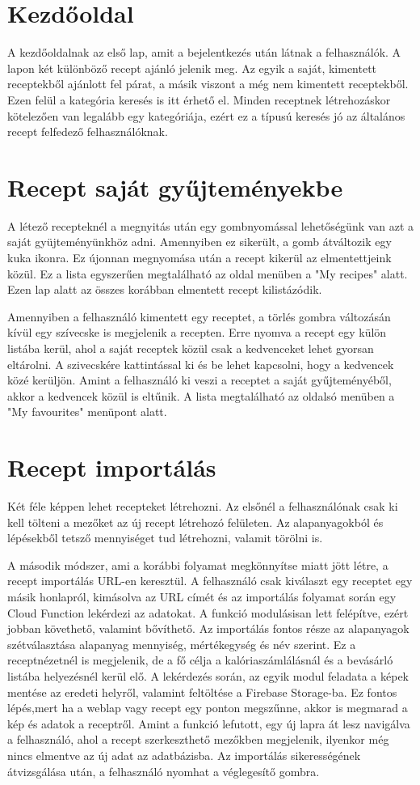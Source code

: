 \documentclass[12pt]{report}
\theoremstyle{definition}
\begin{document}
\section{Kezdőoldal}
A kezdőoldalnak az első lap, amit a bejelentkezés után látnak a felhasználók. A lapon két különböző recept ajánló jelenik meg. Az egyik a saját, kimentett receptekből ajánlott fel párat, a másik viszont a még nem kimentett receptekből. Ezen felül a kategória keresés is itt érhető el. Minden receptnek létrehozáskor kötelezően van legalább egy kategóriája, ezért ez a típusú keresés jó az általános recept felfedező felhasználóknak.

\section{Recept saját gyűjteményekbe}
A létező recepteknél a megnyitás után egy gombnyomással lehetőségünk van azt a saját gyüjteményünkhöz adni. Amennyiben ez sikerült, a gomb átváltozik egy kuka ikonra. Ez újonnan megnyomása után a recept kikerül az elmentettjeink közül. Ez a lista egyszerűen megtalálható az oldal menüben a "My recipes" alatt. Ezen lap alatt az összes korábban elmentett recept kilistázódik.

Amennyiben a felhasználó kimentett egy receptet, a törlés gombra változásán kívül egy szívecske is megjelenik a recepten. Erre nyomva a recept egy külön listába kerül, ahol a saját receptek közül csak a kedvenceket lehet gyorsan eltárolni. A szivecskére kattintással ki és be lehet kapcsolni, hogy a kedvencek közé kerüljön. Amint a felhasználó ki veszi a receptet a saját gyűjteményéből, akkor a kedvencek közül is eltűnik. A lista megtalálható az oldalsó menüben a "My favourites" menüpont alatt.

\section{Recept importálás}
Két féle képpen lehet recepteket létrehozni. Az elsőnél a felhasználónak csak ki kell tölteni a mezőket az új recept létrehozó felületen. Az alapanyagokból és lépésekből tetsző mennyiséget tud létrehozni, valamit törölni is.

A második módszer, ami a korábbi folyamat megkönnyítse miatt jött létre, a recept importálás URL-en keresztül. A felhasználó csak kiválaszt egy receptet egy másik honlapról, kimásolva az URL címét és az importálás folyamat során egy Cloud Function lekérdezi az adatokat. A funkció modulásisan lett felépítve, ezért jobban követhető, valamint bővíthető. Az importálás fontos része az alapanyagok szétválasztása alapanyag mennyiség, mértékegység és név szerint. Ez a receptnézetnél is megjelenik, de a fő célja a kalóriaszámlálásnál és a bevásárló listába helyezésnél kerül elő. A lekérdezés során, az egyik modul feladata a képek mentése az eredeti helyről, valamint feltöltése a Firebase Storage-ba. Ez fontos lépés,mert ha a weblap vagy recept egy ponton megszűnne, akkor is megmarad a  kép és adatok a receptről. Amint a funkció lefutott, egy új lapra át lesz navigálva a felhasználó, ahol a recept szerkeszthető mezőkben megjelenik, ilyenkor még nincs elmentve az új adat az adatbázisba. Az importálás sikerességének átvizsgálása után, a felhasználó nyomhat a véglegesítő gombra.
\end{document}
